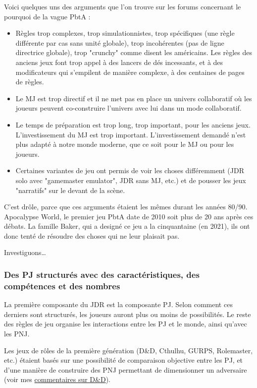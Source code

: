 \documentclass[a4paper, 11pt, twoside]{article}
\begin{document}
Voici quelques uns des arguments que l'on trouve sur les forums concernant le pourquoi de la vague PbtA :
\begin{itemize}
\item Règles trop complexes, trop simulationnistes, trop spécifiques (une règle différente par cas sans unité globale), trop incohérentes (pas de ligne directrice globale), trop "crunchy" comme disent les américains. Les règles des anciens jeux font trop appel à des lancers de dés incessants, et à des modificateurs qui s'empilent de manière complexe, à des centaines de pages de règles.
\item Le MJ est trop directif et il ne met pas en place un univers collaboratif où les joueurs peuvent co-construire l'univers avec lui dans un mode collaboratif.
\item Le temps de préparation est trop long, trop important, pour les anciens jeux. L'investissement du MJ est trop important. L'investissement demandé n'est plus adapté à notre monde moderne, que ce soit pour le MJ ou pour les joueurs.
\item Certaines variantes de jeu ont permis de voir les choses différemment (JDR solo avec "gamemaster emulator", JDR sans MJ, etc.) et de pousser les jeux "narratifs" sur le devant de la scène.
\end{itemize}

C'est drôle, parce que ces arguments étaient les mêmes durant les années 80/90. Apocalypse World, le premier jeu PbtA date de 2010 soit plus de 20 ans après ces débats. La famille Baker, qui a designé ce jeu a la cinquantaine (en 2021), ils ont donc tenté de résoudre des choses qui ne leur plaisait pas.

Investiguons\ldots{} 

\subsubsection{Des PJ structurés avec des caractéristiques, des compétences et des nombres}
\label{sec:org09fc5f8}

La première composante du JDR est la composante PJ. Selon comment ces derniers sont structurés, les joueurs auront plus ou moins de possibilités. Le reste des règles de jeu organise les interactions entre les PJ et le monde, ainsi qu'avec les PNJ.

Les jeux de rôles de la première génération (D\&D, Cthulhu, GURPS, Rolemaster, etc.) étaient basés sur une possibilité de comparaison objective entre les PJ, et d'une manière de construire des PNJ permettant de dimensionner un adversaire (voir mes \href{https://github.com/orey/DandD}{commentaires sur D\&D}).
\end{document}
